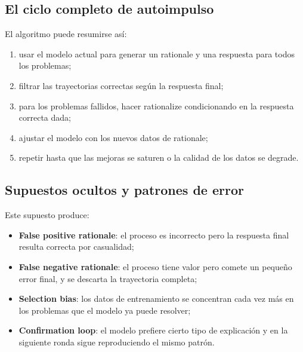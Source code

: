 \subsection{El ciclo completo de autoimpulso}



El algoritmo puede resumirse así:

\begin{enumerate}
    \item usar el modelo actual para generar un rationale y una respuesta para todos los problemas;
    \item filtrar las trayectorias correctas según la respuesta final;
    \item para los problemas fallidos, hacer rationalize condicionando en la respuesta correcta dada;
    \item ajustar el modelo con los nuevos datos de rationale;
    \item repetir hasta que las mejoras se saturen o la calidad de los datos se degrade.
\end{enumerate}

\subsection{Supuestos ocultos y patrones de error}


Este supuesto produce:

\begin{itemize}
    \item \textbf{False positive rationale}: el proceso es incorrecto pero la respuesta final resulta correcta por casualidad;
    \item \textbf{False negative rationale}: el proceso tiene valor pero comete un pequeño error final, y se descarta la trayectoria completa;
    \item \textbf{Selection bias}: los datos de entrenamiento se concentran cada vez más en los problemas que el modelo ya puede resolver;
    \item \textbf{Confirmation loop}: el modelo prefiere cierto tipo de explicación y en la siguiente ronda sigue reproduciendo el mismo patrón.
\end{itemize}

